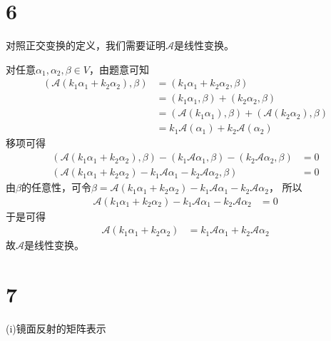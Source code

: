 \documentclass{article}
\begin{document}
\section*{6}

对照正交变换的定义，我们需要证明$\mathscr{A}$是线性变换。

对任意$\alpha_1, \alpha_2, \beta \in V$，由题意可知
\begin{align*}
  (\mathscr{A}(k_1 \alpha_1 + k_2 \alpha_2), \beta)
   & = (k_1 \alpha_1 + k_2 \alpha_2, \beta)                                    \\
   & = (k_1 \alpha_1, \beta) + (k_2 \alpha_2, \beta)                           \\
   & = (\mathscr{A}(k_1 \alpha_1), \beta) + (\mathscr{A}(k_2 \alpha_2), \beta) \\
   & = k_1 \mathscr{A}(\alpha_1) + k_2 \mathscr{A}(\alpha_2)
\end{align*}
移项可得
\begin{align*}
  (\mathscr{A}(k_1 \alpha_1 + k_2 \alpha_2), \beta) - (k_1 \mathscr{A}\alpha_1, \beta) - (k_2 \mathscr{A}\alpha_2, \beta) & = 0 \\
  (\mathscr{A}(k_1 \alpha_1 + k_2 \alpha_2) - k_1 \mathscr{A}\alpha_1 - k_2 \mathscr{A}\alpha_2, \beta)                   & = 0
\end{align*}
由$\beta$的任意性，可令$\beta = \mathscr{A}(k_1 \alpha_1 + k_2 \alpha_2) - k_1 \mathscr{A}\alpha_1 - k_2 \mathscr{A}\alpha_2$，
所以
\begin{align*}
  \mathscr{A}(k_1 \alpha_1 + k_2 \alpha_2) - k_1 \mathscr{A}\alpha_1 - k_2 \mathscr{A}\alpha_2 & = 0
\end{align*}
于是可得
\begin{align*}
  \mathscr{A}(k_1 \alpha_1 + k_2 \alpha_2) & = k_1 \mathscr{A}\alpha_1 + k_2 \mathscr{A}\alpha_2
\end{align*}
故$\mathscr{A}$是线性变换。

\section*{7}

 (i)镜面反射的矩阵表示
\end{document}
